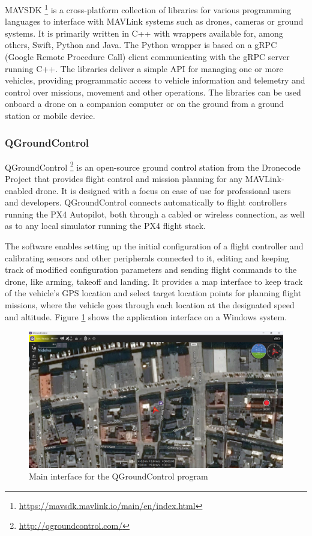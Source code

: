 MAVSDK \footnote{\url{https://mavsdk.mavlink.io/main/en/index.html}} is a cross-platform collection of libraries for various programming languages
to interface with MAVLink systems such as drones, cameras or ground systems.
It is primarily written in C++ with wrappers available for,
among others, Swift, Python and Java.
The Python wrapper is based on a gRPC (Google Remote Procedure Call) client communicating with the gRPC server running C++.
The libraries deliver a simple API for managing one or more vehicles, 
providing programmatic access to vehicle information and telemetry
and control over missions, movement and other operations.
The libraries can be used onboard a drone on a companion computer
or on the ground from a ground station or mobile device.


\subsubsection{QGroundControl}
\label{subsec:qgc}
QGroundControl \footnote{\url{http://qgroundcontrol.com/}} is an open-source ground control station from the Dronecode Project that provides flight control and mission planning for any MAVLink-enabled drone.
It is designed with a focus on ease of use for professional users and developers.
QGroundControl connects automatically to flight controllers running the PX4 Autopilot, both through a cabled or wireless connection, as well as to any local simulator running the PX4 flight stack.

The software enables setting up the initial configuration of a flight controller and calibrating sensors and other peripherals connected to it, editing and keeping track of modified configuration parameters and sending flight commands to the drone, like arming, takeoff and landing.
It provides a map interface to keep track of the vehicle's GPS location and select target location points for planning flight missions, where the vehicle goes through each location at the designated speed and altitude.
Figure \ref{fig:qgc-map} shows the application interface on a Windows system.

\begin{figure}
  \centering
  \includegraphics[width=\textwidth,keepaspectratio]{img/qgc-map.png}
  \caption{Main interface for the QGroundControl program}
  \label{fig:qgc-map}
\end{figure}


